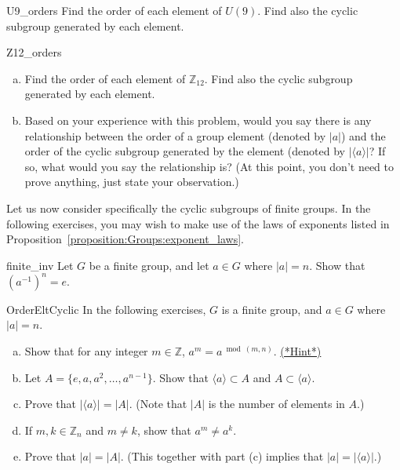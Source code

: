 \begin{exercise}{U9_orders}
Find the order of each element of $U(9)$. Find also the cyclic subgroup generated by each element.
\end{exercise}

\begin{exercise}{Z12_orders}
\begin{enumerate}[(a)]
\item
Find the order of each element of $\mathbb{Z}_{12}$. Find also the cyclic subgroup generated by each element.
\item
Based on your experience with this problem, would you say there is any relationship between the order of a group element (denoted by $|a|$) and the order of the cyclic subgroup generated by the element (denoted by $|\langle a \rangle |$? If so, what would you say the relationship is?  (At this point, you don't need to prove anything, just state your observation.)
\end{enumerate}
\end{exercise}


Let us now consider specifically the cyclic subgroups of finite groups. In the following exercises, you may wish to make use of 
the laws of exponents listed in Proposition~\ref{proposition:Groups:exponent_laws}.

\begin{exercise}{finite_inv}
Let $G$ be a finite group, and let $a \in G$ where $|a|=n$. Show that $(a^{-1})^n = e$.
\end{exercise}

\begin{exercise}{OrderEltCyclic}
In the following exercises, $G$ is a finite group, and  $a \in G$ where $|a|=n$. 
\begin{enumerate}[(a)]
\item
Show that for any integer $m \in \mathbb{Z}$, $a^m = a^{\bmod(m,n)}$.
\hyperref[sec:Groups:Hints]{(*Hint*)} 
\item
Let $A = \{e,a,a^2,\ldots,a^{n-1}\}$.  Show that $\langle a \rangle \subset A$ and $A \subset \langle a \rangle$.
\item 
Prove that $| \langle a \rangle | = |A|$. (Note that $|A|$ is the number of elements in $A$.)
\item
If $m,k \in \mathbb{Z}_n$ and $m \ne k$, show that $a^m \ne a^k$.
\item
Prove that $|a| =|A|$.  (This together with part (c) implies that $|a| =  | \langle a \rangle |$.)
\end{enumerate}
\end{exercise}

